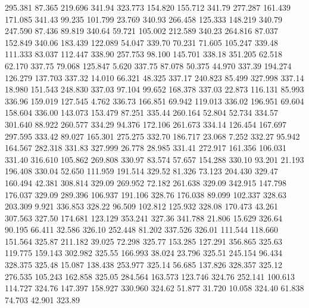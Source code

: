  295.381   87.365  219.696       341.94
 323.773  154.820  155.712       341.79
 277.287  161.439  171.085       341.43
  99.235  101.799   23.769       340.93
 266.458  125.333  148.219       340.79
 247.590   87.436   89.819       340.64
  59.721  105.002  212.589       340.23
 264.816   87.037  152.849       340.06
 183.439  122.089   54.047       339.70
  70.231   71.605  105.247       339.48
 111.333   83.037  112.447       338.90
 257.753   98.100  145.701       338.18
 351.205   62.518   62.170       337.75
  79.068  125.847    5.620       337.75
  87.078   50.375   44.970       337.39
 194.274  126.279  137.703       337.32
  14.010   66.321   48.325       337.17
 240.823   85.499  327.998       337.14
  18.980  151.543  248.830       337.03
  97.104   99.652  168.378       337.03
  22.873  116.131   85.993       336.96
 159.019  127.545    4.762       336.73
 166.851   69.942  119.013       336.02
 196.951   69.604  158.604       336.00
 143.073  153.479   87.251       335.44
 260.164   52.804   52.734       334.57
 301.640   88.922  260.577       334.29
  94.376  172.106  261.673       334.14
 126.454  167.697  297.595       333.42
  89.027  165.301  275.275       332.70
 186.717   23.068    7.252       332.27
  95.942  164.567  282.318       331.83
 327.999   26.778   28.985       331.41
 272.917  161.356  106.031       331.40
 316.610  105.862  269.808       330.97
  83.574   57.657  154.288       330.10
  93.201   21.193  196.408       330.04
  52.650  111.959  191.514       329.52
  81.326   73.123  204.430       329.47
 160.494   42.381  308.814       329.09
 269.952   72.182  261.638       329.09
 342.915  147.798  176.037       329.09
 289.396  106.937  191.106       328.76
 176.038   89.099  102.337       328.63
 203.309    9.921  336.853       328.22
  96.509  102.812  125.932       328.08
 170.473   43.261  307.563       327.50
 174.681  123.129  353.241       327.36
 341.788   21.806   15.629       326.64
  90.195   66.411   32.586       326.10
 252.448   81.202  337.526       326.01
 111.544  118.660  151.564       325.87
 211.182   39.025   72.298       325.77
 153.285  127.291  356.865       325.63
 119.775  159.143  302.982       325.55
 166.993   38.024   23.796       325.51
 245.154   96.434  328.375       325.48
  15.087  138.438  253.977       325.14
  56.685  137.826  328.357       325.12
 276.535  105.243  162.858       325.05
 284.564  163.573  123.746       324.76
 252.141  100.613  114.727       324.76
 147.397  158.927  330.960       324.62
  51.877   31.720   10.058       324.40
  61.838   74.703   42.901       323.89
